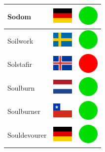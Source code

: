 \documentclass[12pt, a4paper, twoside]{report}
\begin{document}
\begin{center}
\begin{longtable}{|p{5cm}|p{2cm}|p{2cm}|}
Sodom & \includegraphics[width=1cm]{4x3/de} & \includegraphics[width=1cm]{likes/y} \\ \hline
Soilwork & \includegraphics[width=1cm]{4x3/se} & \includegraphics[width=1cm]{likes/y} \\ \hline
Solstafir & \includegraphics[width=1cm]{4x3/is} & \includegraphics[width=1cm]{likes/n} \\ \hline
Soulburn & \includegraphics[width=1cm]{4x3/nl} & \includegraphics[width=1cm]{likes/y} \\ \hline
Soulburner & \includegraphics[width=1cm]{4x3/cl} & \includegraphics[width=1cm]{likes/y} \\ \hline
Souldevourer & \includegraphics[width=1cm]{4x3/de} & \includegraphics[width=1cm]{likes/y} \\ \hline

\end{longtable}
\end{center}
\end{document}
